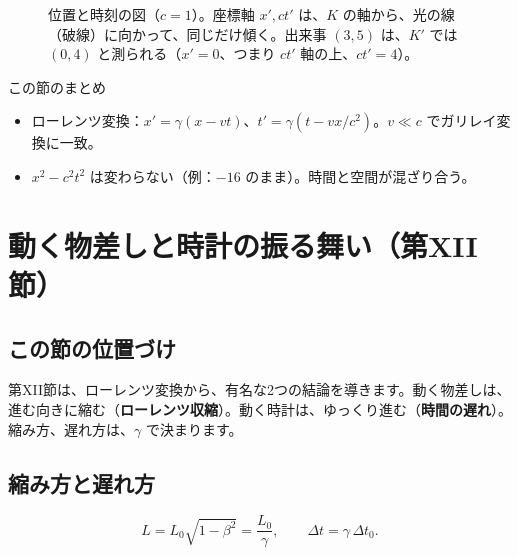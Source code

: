 \documentclass[a4paper,11pt,openany]{ltjsbook}
\begin{document}
\begin{figure}[htbp]
\centering
{}
\caption{位置と時刻の図（$c=1$）。座標軸 $x',ct'$ は、$K$ の軸から、光の線（破線）に向かって、同じだけ傾く。出来事 $(3,5)$ は、$K'$ では $(0,4)$ と測られる（$x'=0$、つまり $ct'$ 軸の上、$ct'=4$）。}
\end{figure}

\begin{pointbox}{この節のまとめ}
\begin{itemize}[leftmargin=*]
\item ローレンツ変換：$x'=\gamma(x-vt)$、$t'=\gamma(t-vx/c^2)$。$v\ll c$ でガリレイ変換に一致。
\item $x^2-c^2t^2$ は変わらない（例：$-16$ のまま）。時間と空間が混ざり合う。
\end{itemize}
\end{pointbox}

\chapter{動く物差しと時計の振る舞い（第XII節）}

\section{この節の位置づけ}

第XII節は、ローレンツ変換から、有名な2つの結論を導きます。動く物差しは、進む向きに縮む（\textbf{ローレンツ収縮}）。動く時計は、ゆっくり進む（\textbf{時間の遅れ}）。縮み方、遅れ方は、$\gamma$ で決まります。

\section{縮み方と遅れ方}

\[
L=L_0\sqrt{1-\beta^2}=\frac{L_0}{\gamma},\qquad \Delta t=\gamma\,\Delta t_0 .
\]
\end{document}
